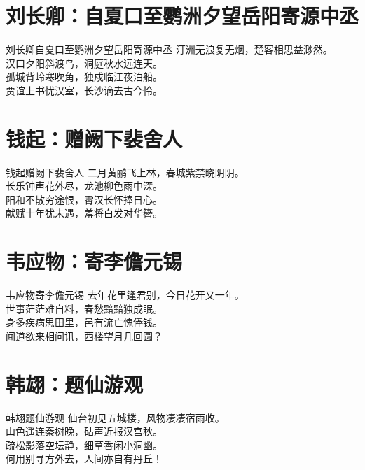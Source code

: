 \documentclass[12pt,oneside,a5paper]{book}
\begin{document}
\chapter{刘长卿：自夏口至鹦洲夕望岳阳寄源中丞}
\begin{poemzh}{刘长卿}{自夏口至鹦洲夕望岳阳寄源中丞}
汀洲无浪复无烟，楚客相思益渺然。\\
汉口夕阳斜渡鸟，洞庭秋水远连天。\\
孤城背岭寒吹角，独戍临江夜泊船。\\
贾谊上书忧汉室，长沙谪去古今怜。\\ 
\end{poemzh}

\chapter{钱起：赠阙下裴舍人}
\begin{poemzh}{钱起}{赠阙下裴舍人}
二月黄鹂飞上林，春城紫禁晓阴阴。\\
长乐钟声花外尽，龙池柳色雨中深。\\
阳和不散穷途恨，霄汉长怀捧日心。\\
献赋十年犹未遇，羞将白发对华簪。\\ 
\end{poemzh}

\chapter{韦应物：寄李儋元锡}
\begin{poemzh}{韦应物}{寄李儋元锡}
去年花里逢君别，今日花开又一年。\\
世事茫茫难自料，春愁黯黯独成眠。\\
身多疾病思田里，邑有流亡愧俸钱。\\
闻道欲来相问讯，西楼望月几回圆？\\ 
\end{poemzh}

\chapter{韩翃：题仙游观}
\begin{poemzh}{韩翃}{题仙游观}
仙台初见五城楼，风物凄凄宿雨收。\\
山色遥连秦树晚，砧声近报汉宫秋。\\
疏松影落空坛静，细草香闲小洞幽。\\
何用别寻方外去，人间亦自有丹丘！\\ 
\end{poemzh}
\end{document}
